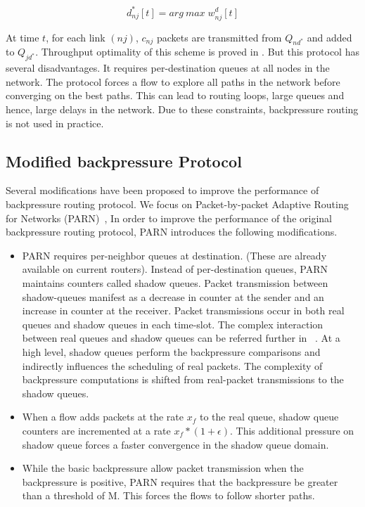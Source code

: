 \begin{equation}
d^{*}_{nj}[t] = arg\:max\;{w_{nj}^{d}[t]}
\end{equation}

At time $t$, for each link $(nj)$, $c_{nj}$ packets are transmitted from $Q_{nd^{*}}$ and added to $Q_{jd^{*}}$. Throughput optimality of this scheme is proved in \cite{BP-orig}. But this protocol has several disadvantages. It requires per-destination queues at all nodes in the network. The protocol forces a flow to explore all paths in the network before converging on the best paths. This can lead to routing loops, large queues and hence, large delays in the network. Due to these constraints, backpressure routing is not used in practice.

\subsection{Modified backpressure Protocol}
Several modifications have been proposed to improve the performance of backpressure routing protocol. We focus on Packet-by-packet Adaptive Routing for Networks (PARN)~\cite{Srikant3}, In order to improve the performance of the original backpressure routing protocol, PARN introduces the following modifications.
\begin{itemize}
\item PARN requires per-neighbor queues at destination. (These are already available on current routers). Instead of per-destination queues, PARN maintains counters called shadow queues. Packet transmission between shadow-queues manifest as a decrease in counter at the sender and an increase in counter at the receiver. Packet transmissions occur in both real queues and shadow queues in each time-slot. The complex interaction between real queues and shadow queues can be referred further in ~\cite{Srikant3}. At a high level, shadow queues perform the backpressure comparisons and indirectly influences the scheduling of real packets. The complexity of backpressure computations is shifted from real-packet transmissions to the shadow queues.

\item When a flow adds packets at the rate $x_{f}$ to the real queue, shadow queue counters are incremented at a rate $ x_{f} * (1+\epsilon)$. This additional pressure on shadow queue forces a faster convergence in the shadow queue domain. 

\item While the basic backpressure allow packet transmission when the backpressure is positive, PARN requires that the backpressure be greater than a threshold of M. This forces the flows to follow shorter paths.
\end{itemize}

